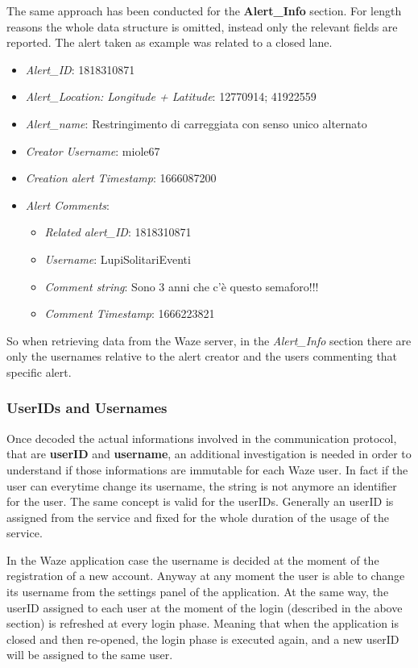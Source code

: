 			\par The same approach has been conducted for the \textbf{Alert\_Info} section. For length reasons the whole data structure is omitted, instead only the relevant fields are reported. The alert taken as example was related to a closed lane.
			 \begin{itemize}
			 	\item \textit{Alert\_ID}: 1818310871
			 	\item \textit{Alert\_Location: Longitude + Latitude}: 12770914; 41922559
			 	\item \textit{Alert\_name}: Restringimento di carreggiata con senso unico alternato
			 	\item \textit{Creator Username}: miole67
			 	\item \textit{Creation alert Timestamp}: 1666087200
			 	\item \textit{Alert Comments}:
			 		\begin{itemize}
			 			\item \textit{Related alert\_ID}: 1818310871
			 			\item \textit{Username}: LupiSolitariEventi
			 			\item \textit{Comment string}: Sono 3 anni che c’è questo semaforo!!!
			 			\item \textit{Comment Timestamp}: 1666223821
			 		\end{itemize}
			 \end{itemize}
			So when retrieving data from the Waze server, in the \textit{Alert\_Info} section there are only the usernames relative to the alert creator and the users commenting that specific alert.
			
			\subsubsection{UserIDs and Usernames}
				\par Once decoded the actual informations involved in the communication protocol, that are \textbf{userID} and \textbf{username}, an additional investigation is needed in order to understand if those informations are immutable for each Waze user. In fact if the user can everytime change its username, the string is not anymore an identifier for the user. The same concept is valid for the userIDs. Generally an userID is assigned from the service and fixed for the whole duration of the usage of the service. \newline
				\par In the Waze application case the username is decided at the moment of the registration of a new account. Anyway at any moment the user is able to change its username from the settings panel of the application.\newline
				At the same way, the userID assigned to each user at the moment of the login (described in the above section) is refreshed at every login phase. Meaning that when the application is closed and then re-opened, the login phase is executed again, and a new userID will be assigned to the same user.
			
